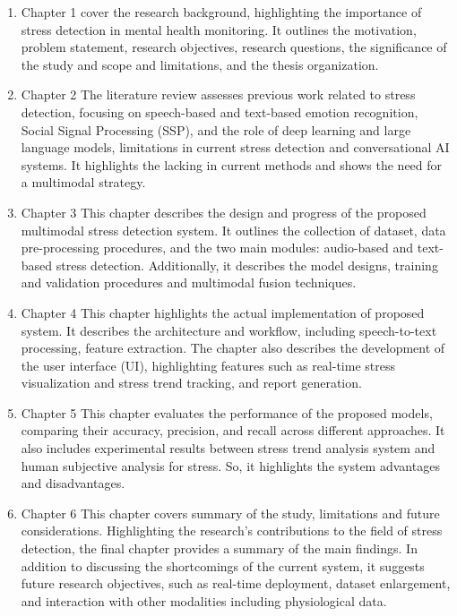 \documentclass[Arial,12pt,openright,twoside]{book}
\begin{document}
  \begin{enumerate} 
  \item  Chapter 1 cover  the research background, highlighting the importance of stress detection in mental health monitoring. It outlines the motivation, problem statement, research objectives, research questions, the significance of the study and scope and limitations, and the thesis organization. 
   \item Chapter 2 The literature review assesses previous work related to stress detection, focusing on speech-based and text-based emotion recognition, Social Signal Processing (SSP), and the role of deep learning and large language models, limitations in current stress detection and conversational AI systems. It highlights the lacking in current methods and shows the need for a multimodal strategy. 
   \item Chapter 3 This chapter describes the design and progress of the proposed multimodal stress detection system. It outlines the collection of dataset, data pre-processing procedures, and the two main modules: audio-based and text-based stress detection. Additionally, it describes the model designs, training and validation procedures and multimodal fusion techniques. 
   \item Chapter 4 This chapter highlights the actual implementation of proposed system. It describes the architecture and workflow, including speech-to-text processing, feature extraction. The chapter also describes the development of the user interface (UI), highlighting features such as real-time stress visualization and stress trend tracking, and report generation.
  \item  Chapter 5 This  chapter evaluates the performance of the proposed models, comparing their accuracy, precision, and recall across different approaches. It also includes experimental results between stress trend analysis system and human subjective analysis for stress. So, it highlights the system advantages and disadvantages.
  \item  Chapter 6 This chapter covers summary of the study, limitations and future considerations. Highlighting the research's contributions to the field of stress detection, the final chapter provides a summary of the main findings. In addition to discussing the shortcomings of the current system, it suggests future research objectives, such as real-time deployment, dataset enlargement, and interaction with other modalities including physiological data.

   \end{enumerate}
\end{document}
